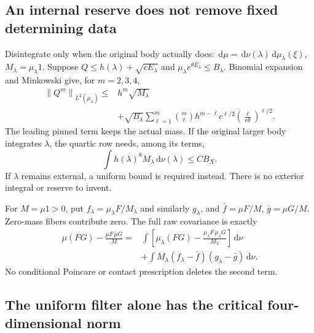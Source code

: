 \documentclass[11pt,letterpaper]{article}
\numberwithin{equation}{section}
\theoremstyle{plain}
\theoremstyle{remark}\newtheorem{remark}[theorem]{Scope}
\newcommand{\dd}{\,\mathrm d}\newcommand{\eps}{\varepsilon}
\newcommand{\norm}[1]{\left\lVert#1\right\rVert}
\begin{document}
\subsection{An internal reserve does not remove fixed determining data}

Disintegrate only when the original body actually does:
$\dd\mu=\dd\nu(\lambda)\dd\mu_\lambda(\xi)$,
$M_\lambda=\mu_\lambda1$. Suppose
$Q\le h(\lambda)+\sqrt{cE_\lambda}$ and
$\mu_\lambda e^{\theta E_\lambda}\le B_\lambda$.
Binomial expansion and Minkowski give, for $m=2,3,4$,
\begin{align}
 \norm{Q^m}_{L^2(\mu_\lambda)}
 \le {}&h^m\sqrt{M_\lambda} \nonumber\\
 &+\sqrt{B_\lambda}\sum_{\ell=1}^m
 \binom m\ell h^{m-\ell}c^{\ell/2}
 \left(\frac{\ell}{\mathrm e\theta}\right)^{\ell/2}.
 \label{eq:pinned}
\end{align}
The leading pinned term keeps the actual mass. If the original larger body
integrates $\lambda$, the quartic row needs, among its terms,
\begin{equation}
 \int h(\lambda)^8M_\lambda\dd\nu(\lambda)\le CB_X.
 \label{eq:pinnedtarget}
\end{equation}
If $\lambda$ remains external, a uniform bound is required instead. There
is no exterior integral or reserve to invent.

For $M=\mu1>0$, put $f_\lambda=\mu_\lambda F/M_\lambda$ and similarly
$g_\lambda$, and $\bar f=\mu F/M$, $\bar g=\mu G/M$. Zero-mass fibers
contribute zero. The full raw covariance is exactly
\begin{align}
 \mu(FG)-\frac{\mu F\,\mu G}{M}
 ={}&\int\left[\mu_\lambda(FG)
       -\frac{\mu_\lambda F\,\mu_\lambda G}{M_\lambda}\right]\dd\nu
       \nonumber\\
 &+\int M_\lambda(f_\lambda-\bar f)(g_\lambda-\bar g)\dd\nu.
 \label{eq:totalcov}
\end{align}
No conditional Poincare or contact prescription deletes the second term.

\subsection{The uniform filter alone has the critical four-dimensional norm}
\end{document}
